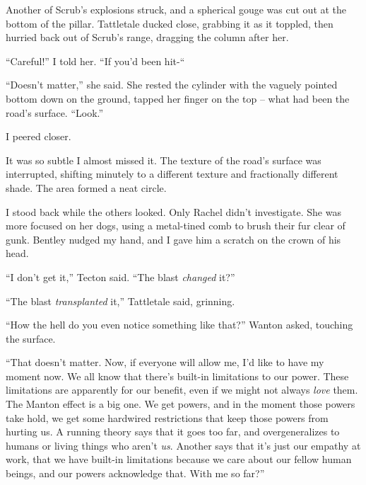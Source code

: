 Another of Scrub's explosions struck, and a spherical gouge was cut out at the bottom of the pillar.  Tattletale ducked close, grabbing it as it toppled, then hurried back out of Scrub's range, dragging the column after her.



``Careful!'' I told her.  ``If you'd been hit-``



``Doesn't matter,'' she said.  She rested the cylinder with the vaguely pointed bottom down on the ground, tapped her finger on the top – what had been the road's surface.  ``Look.''



I peered closer.



It was so subtle I almost missed it.  The texture of the road's surface was interrupted, shifting minutely to a different texture and fractionally different shade.  The area formed a neat circle.



I stood back while the others looked.  Only Rachel didn't investigate.  She was more focused on her dogs, using a metal-tined comb to brush their fur clear of gunk.  Bentley nudged my hand, and I gave him a scratch on the crown of his head.



``I don't get it,'' Tecton said.  ``The blast \emph{changed} it?''



``The blast \emph{transplanted} it,'' Tattletale said, grinning. 



``How the hell do you even notice something like that?'' Wanton asked, touching the surface.



``That doesn't matter.  Now, if everyone will allow me, I'd like to have my moment now.  We all know that there's built-in limitations to our power.  These limitations are apparently for our benefit, even if we might not always \emph{love} them.  The Manton effect is a big one.  We get powers, and in the moment those powers take hold, we get some hardwired restrictions that keep those powers from hurting us.  A running theory says that it goes too far, and overgeneralizes to humans or living things who aren't \emph{us}.  Another says that it's just our empathy at work, that we have built-in limitations because we care about our fellow human beings, and our powers acknowledge that.  With me so far?''



